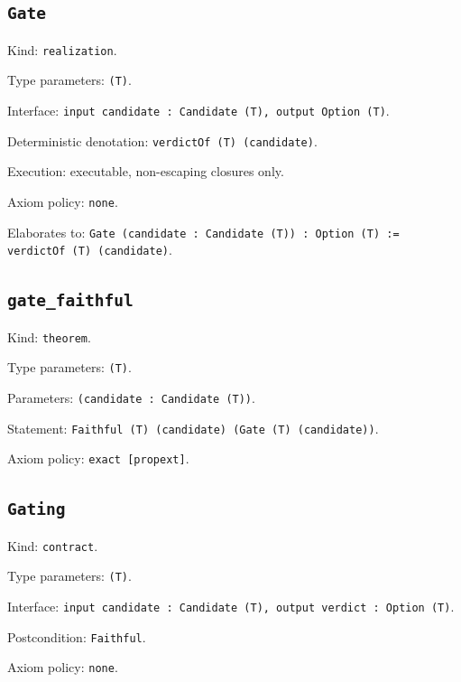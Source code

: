 \documentclass[11pt]{article}
\begin{document}
\subsection*{\texttt{Gate}}
\noindent Kind: \texttt{realization}.\par
\noindent Type parameters: \texttt{(T)}.\par
\noindent Interface: \texttt{input candidate : Candidate (T), output Option (T)}.\par
\noindent Deterministic denotation: \texttt{verdictOf (T) (candidate)}.\par
\noindent Execution: executable, non-escaping closures only.\par
\noindent Axiom policy: \texttt{none}.\par
\noindent Elaborates to: \texttt{Gate (candidate : Candidate (T)) : Option (T) := verdictOf (T) (candidate)}.\par
\subsection*{\texttt{gate\_faithful}}
\noindent Kind: \texttt{theorem}.\par
\noindent Type parameters: \texttt{(T)}.\par
\noindent Parameters: \texttt{(candidate : Candidate (T))}.\par
\noindent Statement: \texttt{Faithful (T) (candidate) (Gate (T) (candidate))}.\par
\noindent Axiom policy: \texttt{exact [propext]}.\par
\subsection*{\texttt{Gating}}
\noindent Kind: \texttt{contract}.\par
\noindent Type parameters: \texttt{(T)}.\par
\noindent Interface: \texttt{input candidate : Candidate (T), output verdict : Option (T)}.\par
\noindent Postcondition: \texttt{Faithful}.\par
\noindent Axiom policy: \texttt{none}.\par
\end{document}
